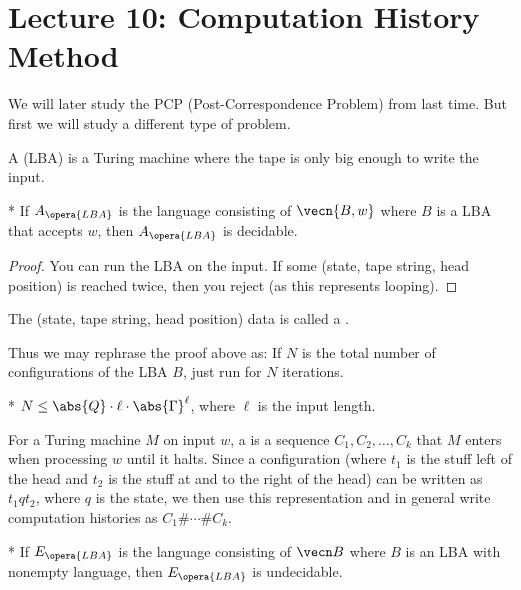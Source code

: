 \section*{Lecture 10: Computation History Method}
\setcounter{section}{10}

We will later study the PCP (Post-Correspondence Problem) from last time. But first we will study a different type of problem.

\begin{defn}
	A  (LBA) is a Turing machine where the tape is only big enough to write the input.
\end{defn}

\begin{fact}*
	If $A_{\opera{LBA}}$ is the language consisting of $\vecn{B,w}$ where $B$ is a LBA that accepts $w$, then $A_{\opera{LBA}}$ is decidable.
\end{fact}

\begin{proof}
	You can run the LBA on the input. If some (state, tape string, head position) is reached twice, then you reject (as this represents looping).
\end{proof}

\begin{defn}
	The (state, tape string, head position) data is called a .
\end{defn}

Thus we may rephrase the proof above as: If $N$ is the total number of configurations of the LBA $B$, just run for $N$ iterations.

\begin{fact}*
	$N\leq \abs{Q} \cdot \ell \cdot \abs{\Gamma}^\ell$, where $\ell$ is the input length.
\end{fact}

\begin{defn}
	For a Turing machine $M$ on input $w$, a  is a sequence $C_1, C_2, \ldots, C_k$ that $M$ enters when processing $w$ until it halts.
	Since a configuration (where $t_1$ is the stuff left of the head and $t_2$ is the stuff at and to the right of the head) can be written as $t_1qt_2$, where $q$ is the state, we then use this representation and in general write computation histories as $C_1\# \cdots \# C_k$.
\end{defn}

\begin{fact}*
	If $E_{\opera{LBA}}$ is the language consisting of $\vecn B$ where $B$ is an LBA with nonempty language, then $E_{\opera{LBA}}$ is undecidable.
\end{fact}

